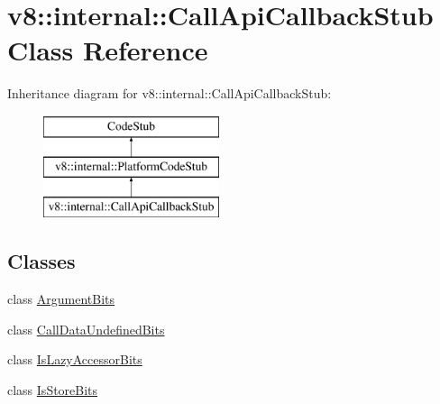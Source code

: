 \hypertarget{classv8_1_1internal_1_1_call_api_callback_stub}{}\section{v8\+:\+:internal\+:\+:Call\+Api\+Callback\+Stub Class Reference}
\label{classv8_1_1internal_1_1_call_api_callback_stub}
Inheritance diagram for v8\+:\+:internal\+:\+:Call\+Api\+Callback\+Stub\+:\begin{figure}[H]
\begin{center}
\leavevmode
\includegraphics[height=3.000000cm]{classv8_1_1internal_1_1_call_api_callback_stub}
\end{center}
\end{figure}
\subsection*{Classes}
\begin{DoxyCompactItemize}
\item 
class \hyperlink{classv8_1_1internal_1_1_call_api_callback_stub_1_1_argument_bits}{Argument\+Bits}
\item 
class \hyperlink{classv8_1_1internal_1_1_call_api_callback_stub_1_1_call_data_undefined_bits}{Call\+Data\+Undefined\+Bits}
\item 
class \hyperlink{classv8_1_1internal_1_1_call_api_callback_stub_1_1_is_lazy_accessor_bits}{Is\+Lazy\+Accessor\+Bits}
\item 
class \hyperlink{classv8_1_1internal_1_1_call_api_callback_stub_1_1_is_store_bits}{Is\+Store\+Bits}
\end{DoxyCompactItemize}
